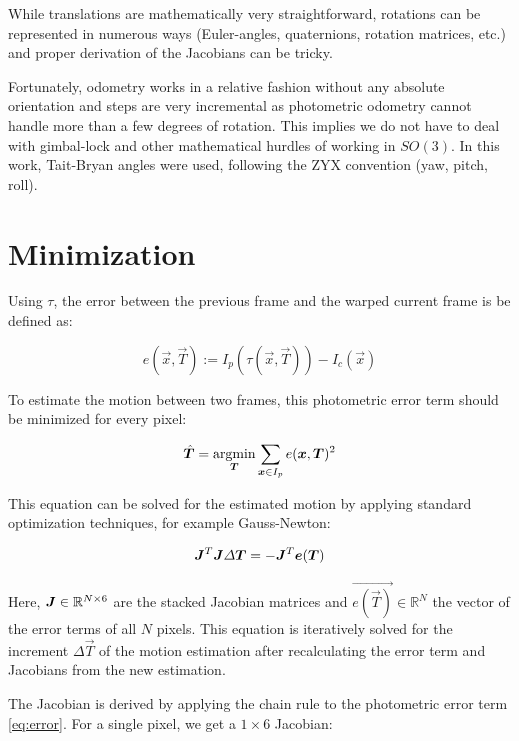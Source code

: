 While translations are mathematically very straightforward, rotations can be
represented in numerous ways (Euler-angles, quaternions, rotation matrices,
etc.) and proper derivation of the Jacobians can be tricky.

Fortunately, odometry works in a relative fashion without any absolute
orientation and steps are very incremental as photometric odometry cannot
handle more than a few degrees of rotation. This implies we do not have to deal
with gimbal-lock and other mathematical hurdles of working in $SO(3)$. In this
work, Tait-Bryan angles were used, following the ZYX convention (yaw, pitch,
roll).




\section{Minimization}

Using $\tau$, the error between the previous frame and the warped current frame is be defined as:

\begin{equation}
    \label{eq:error}
    e(\vec{x}, \vec{T}) := I_p(\tau(\vec{x}, \vec{T})) - I_c(\vec{x})
\end{equation}


To estimate the motion between two frames, this photometric error term should
be minimized for every pixel:

\begin{equation}
    \vec{\hat{T}} = \operatornamewithlimits{argmin}_{\vec{T}} \sum_{\vec{x} \in I_p} e(\vec{x}, \vec{T})^2
\end{equation}


This equation can be solved for the estimated motion by applying standard
optimization techniques, for example Gauss-Newton:

\begin{equation}
    \mat{J}^T \mat{J} \Delta \vec{T} = - \mat{J}^T \vec{e(\vec{T})}
\end{equation}

Here, $\mat{J} \in \mathbb{R}^{N \times 6}$ are the stacked Jacobian matrices
and $\vec{e(\vec{T})} \in \mathbb{R}^N$ the vector of the error terms of all
$N$ pixels.  This equation is iteratively solved for the increment $\Delta
\vec{T}$ of the motion estimation after recalculating the error term and
Jacobians from the new estimation.

The Jacobian is derived by applying the chain rule to the photometric error term \ref{eq:error}.
For a single pixel, we get a $1 \times 6$ Jacobian:

